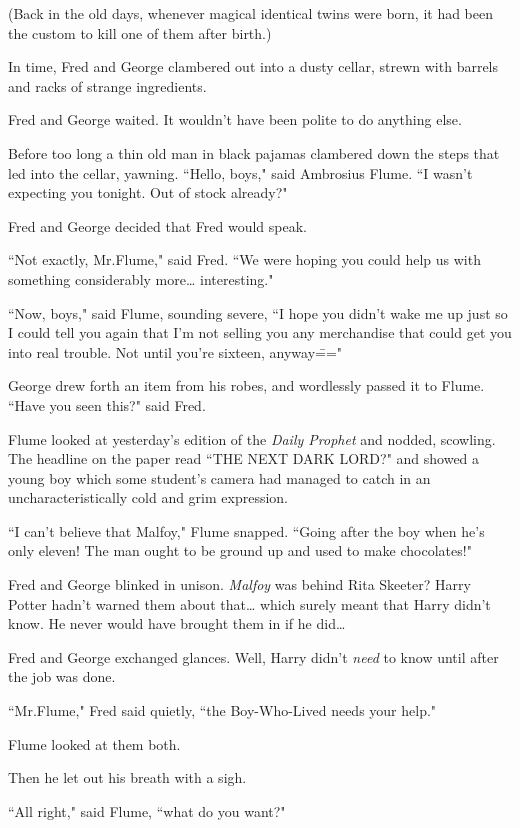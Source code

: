 (Back in the old days, whenever magical identical twins were born, it had been the custom to kill one of them after birth.)

In time, Fred and George clambered out into a dusty cellar, strewn with barrels and racks of strange ingredients.

Fred and George waited. It wouldn't have been polite to do anything else.

Before too long a thin old man in black pajamas clambered down the steps that led into the cellar, yawning. ``Hello, boys," said Ambrosius Flume. ``I wasn't expecting you tonight. Out of stock already?"

Fred and George decided that Fred would speak.

``Not exactly, Mr.\?Flume," said Fred. ``We were hoping you could help us with something considerably more{\ldots} interesting."

``Now, boys," said Flume, sounding severe, ``I hope you didn't wake me up just so I could tell you again that I'm not selling you any merchandise that could get you into real trouble. Not until you're sixteen, anyway\==="

George drew forth an item from his robes, and wordlessly passed it to Flume. ``Have you seen this?" said Fred.

Flume looked at yesterday's edition of the \emph{Daily Prophet} and nodded, scowling. The headline on the paper read ``THE NEXT DARK LORD?" and showed a young boy which some student's camera had managed to catch in an uncharacteristically cold and grim expression.

``I can't believe that Malfoy," Flume snapped. ``Going after the boy when he's only eleven! The man ought to be ground up and used to make chocolates!"

Fred and George blinked in unison. \emph{Malfoy} was behind Rita Skeeter? Harry Potter hadn't warned them about that{\ldots} which surely meant that Harry didn't know. He never would have brought them in if he did{\ldots}

Fred and George exchanged glances. Well, Harry didn't \emph{need} to know until after the job was done.

``Mr.\?Flume," Fred said quietly, ``the Boy-Who-Lived needs your help."

Flume looked at them both.

Then he let out his breath with a sigh.

``All right," said Flume, ``what do you want?"

